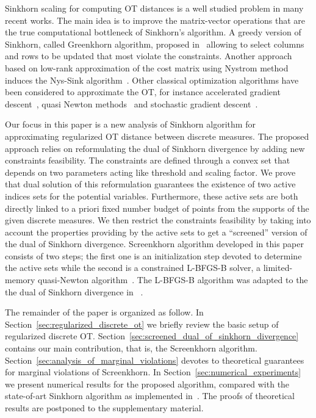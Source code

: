 Sinkhorn scaling for computing OT distances is a well studied problem in many recent works. 
The main idea is to improve the matrix-vector operations that are the true computational bottleneck of Sinkhorn’s algorithm. 
A greedy version of Sinkhorn, called Greenkhorn algorithm, proposed in~\cite{altschulernips17} allowing to select columns and rows to be updated that most violate the constraints.                   
Another approach based on low-rank approximation of the cost matrix using Nystrom method induces the Nys-Sink algorithm~\cite{altschuler2018Nystrom}. 
Other classical optimization algorithms have been considered to approximate the OT, for instance accelerated gradient descent~\cite{dvurechensky18aICML,lin2019}, quasi Newton methods~\cite{blondel2018ICML,cuturi2016SIAM} and stochastic gradient descent~\cite{genevay2016stochOT,khalilabid2018}. 

Our focus in this paper is a new analysis of Sinkhorn algorithm for approximating regularized OT distance between discrete measures.
The proposed approach relies on reformulating the dual of Sinkhorn divergence by adding new constraints feasibility.
The constraints are defined through a convex set that depends on two parameters acting like threshold and scaling factor.
We prove that dual solution of this reformulation guarantees the existence of two active indices sets for the potential variables.
Furthermore, these active sets are both directly linked to a priori fixed number budget of points from the supports of the given discrete measures.
We then restrict the constraints feasibility by taking into account the properties providing by the active sets to get a ``screened'' version of the dual of Sinkhorn divergence. 
Screenkhorn algorithm developed in this paper consists of two steps; the first one is an initialization step devoted to determine the active sets while the second is a constrained L-BFGS-B solver, a limited-memory quasi-Newton algorithm~\cite{nocedal1980,nocedal2006numerical}. 
The L-BFGS-B algorithm was adapted to the the dual of Sinkhorn divergence in ~\cite{cuturi2016SIAM,blondel2018ICML}.

The remainder of the paper is organized as follow. In Section~\ref{sec:regularized_discrete_ot} we briefly review the basic setup of regularized discrete OT. 
Section~\ref{sec:screened_dual_of_sinkhorn_divergence} contains our main contribution, that is, the Screenkhorn algorithm. 
Section~\ref{sec:analysis_of_marginal_violations} devotes to theoretical guarantees for marginal violations of Screenkhorn. 
In Section~\ref{sec:numerical_experiments} we present numerical results for the proposed algorithm, compared with the state-of-art Sinkhorn algorithm as implemented in~\cite{flamary2017pot}. 
The proofs of theoretical results are postponed to the supplementary material.

